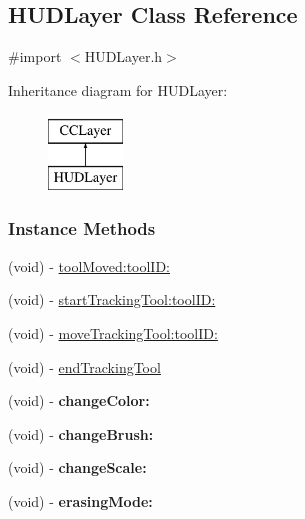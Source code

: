 \hypertarget{interface_h_u_d_layer}{\subsection{H\-U\-D\-Layer Class Reference}
\label{d3/d8a/interface_h_u_d_layer}
}


{\ttfamily \#import $<$H\-U\-D\-Layer.\-h$>$}

Inheritance diagram for H\-U\-D\-Layer\-:\begin{figure}[H]
\begin{center}
\leavevmode
\includegraphics[height=2.000000cm]{d3/d8a/interface_h_u_d_layer}
\end{center}
\end{figure}
\subsubsection*{Instance Methods}
\begin{DoxyCompactItemize}
\item 
(void) -\/ \hyperlink{interface_h_u_d_layer_a4c9b0669e5d9c7f787df2d2db3b70650}{tool\-Moved\-:tool\-I\-D\-:}
\item 
(void) -\/ \hyperlink{interface_h_u_d_layer_a1665f0f39e98837d8fd851d6ffd10070}{start\-Tracking\-Tool\-:tool\-I\-D\-:}
\item 
(void) -\/ \hyperlink{interface_h_u_d_layer_aa9d2fea251c1f1dfd3a4c86673068c3a}{move\-Tracking\-Tool\-:tool\-I\-D\-:}
\item 
(void) -\/ \hyperlink{interface_h_u_d_layer_ace1d8e50cc1942bb7ed538848d01f00b}{end\-Tracking\-Tool}
\item 
\hypertarget{interface_h_u_d_layer_a15d2dcde1af34b73b29a4b5dc52ebce4}{(void) -\/ {\bfseries change\-Color\-:}}\label{d3/d8a/interface_h_u_d_layer_a15d2dcde1af34b73b29a4b5dc52ebce4}

\item 
\hypertarget{interface_h_u_d_layer_aee53da85f79a46eea3882404f56d3ce6}{(void) -\/ {\bfseries change\-Brush\-:}}\label{d3/d8a/interface_h_u_d_layer_aee53da85f79a46eea3882404f56d3ce6}

\item 
\hypertarget{interface_h_u_d_layer_aa308a687e9869d1f3d11f22c71e68c73}{(void) -\/ {\bfseries change\-Scale\-:}}\label{d3/d8a/interface_h_u_d_layer_aa308a687e9869d1f3d11f22c71e68c73}

\item 
\hypertarget{interface_h_u_d_layer_a1e326ceaa62e14c61a98813e90c0973e}{(void) -\/ {\bfseries erasing\-Mode\-:}}\label{d3/d8a/interface_h_u_d_layer_a1e326ceaa62e14c61a98813e90c0973e}

\end{DoxyCompactItemize}
